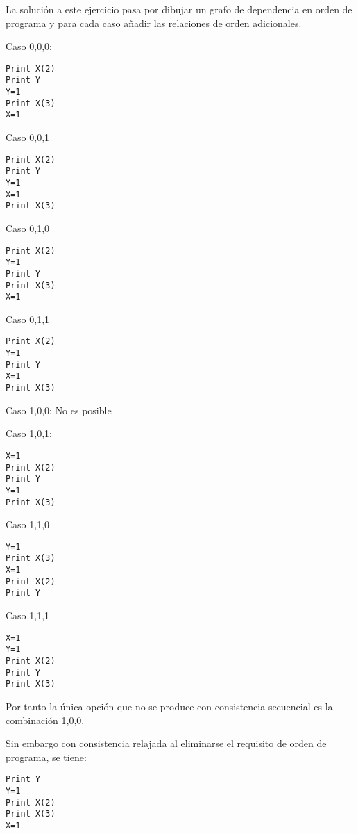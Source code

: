 \begin{acsolution}\end{acsolution}


La solución a este ejercicio pasa por dibujar un grafo de dependencia en orden
de programa y para cada caso añadir las relaciones de orden adicionales.

Caso 0,0,0:

\begin{lstlisting}
Print X(2)
Print Y
Y=1
Print X(3)
X=1
\end{lstlisting}

Caso 0,0,1

\begin{lstlisting}
Print X(2)
Print Y
Y=1
X=1
Print X(3)
\end{lstlisting}

Caso 0,1,0

\begin{lstlisting}
Print X(2)
Y=1
Print Y
Print X(3)
X=1
\end{lstlisting}

Caso 0,1,1

\begin{lstlisting}
Print X(2)
Y=1
Print Y
X=1
Print X(3)
\end{lstlisting}

Caso 1,0,0: {\color{red}No es posible}

Caso 1,0,1:

\begin{lstlisting}
X=1
Print X(2)
Print Y
Y=1
Print X(3)
\end{lstlisting}

Caso 1,1,0

\begin{lstlisting}
Y=1
Print X(3)
X=1
Print X(2)
Print Y
\end{lstlisting}

Caso 1,1,1

\begin{lstlisting}
X=1
Y=1
Print X(2)
Print Y
Print X(3)
\end{lstlisting}

Por tanto la única opción que no se produce con consistencia secuencial es la combinación 1,0,0.

Sin embargo con consistencia relajada al eliminarse el requisito de orden de programa, se tiene:

\begin{lstlisting}
Print Y
Y=1
Print X(2)
Print X(3)
X=1
\end{lstlisting}
